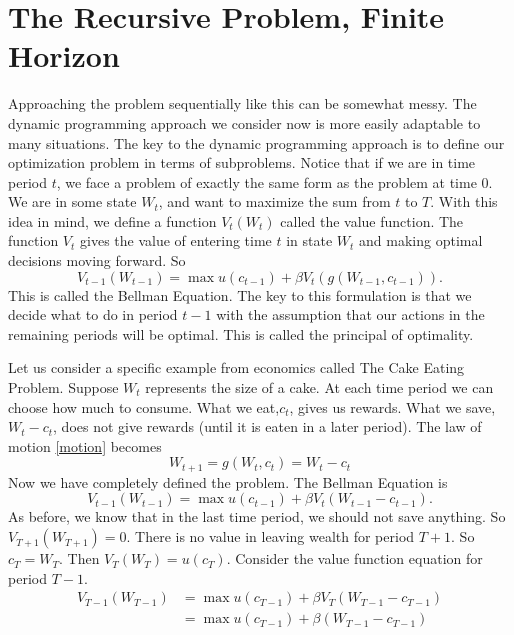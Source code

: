 \section*{The Recursive Problem, Finite Horizon}
\label{SecRecProbFinHor}
Approaching the problem sequentially like this can be somewhat messy.  The dynamic programming approach we consider now is more easily adaptable to many situations.  The key to the dynamic programming approach is to define our optimization problem in terms of subproblems.  Notice that if we are in time period $t$, we face a problem of exactly the same form as the problem at time $0$.  We are in some state $W_t$, and want to maximize the sum from $t$ to $T$.  With this idea in mind, we define a function $V_t(W_t)$ called the value function.  The function $V_t$ gives the value of entering time $t$ in state $W_t$ and making optimal decisions moving forward.  So
\begin{equation*}
V_{t-1}(W_{t-1}) = \max u(c_{t-1}) + \beta V_t(g(W_{t-1},c_{t-1})).
\end{equation*}
This is called the Bellman Equation.  The key to this formulation is that we decide what to do in period $t-1$ with the assumption that our actions in the remaining periods will be optimal.  This is called the principal of optimality.

Let us consider a specific example from economics called The Cake Eating Problem.  Suppose $W_t$ represents the size of a cake.  At each time period we can choose how much to consume.  What we eat,$c_t$, gives us rewards.  What we save,$W_t-c_t$, does not give rewards (until it is eaten in a later period).  The law of motion \eqref{motion} becomes
\begin{equation}\label{LOM_EX}
W_{t+1} = g(W_t,c_t) = W_t-c_t
\end{equation}
Now we have completely defined the problem.  The Bellman Equation is
\begin{equation*}
V_{t-1}(W_{t-1}) = \max u(c_{t-1}) + \beta V_t(W_{t-1}-c_{t-1}).
\end{equation*}
As before, we know that in the last time period, we should not save anything.  So $V_{T+1}(W_{T+1}) = 0$.  There is no value in leaving wealth for period $T+1$.  So $c_T = W_T$.  Then $V_T(W_T) = u(c_T)$.  Consider the value function equation for period $T-1$.
\begin{align*}
V_{T-1}(W_{T-1}) &= \max u(c_{T-1}) + \beta V_T(W_{T-1}-c_{T-1}) \\
                 &= \max u(c_{T-1}) + \beta (W_{T-1}-c_{T-1})
\end{align*}

